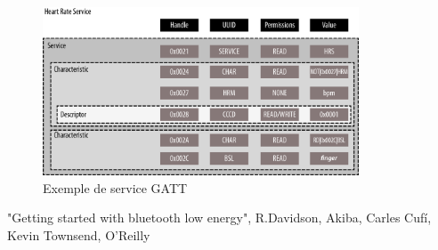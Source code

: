 \begin{frame}
	\begin{figure}
		\includegraphics[height=5cm]{img/gatt.png}
		\caption{Exemple de service GATT}
	\end{figure}
{\tiny "Getting started with bluetooth low energy", R.Davidson, Akiba, Carles Cufí, Kevin Townsend, O'Reilly}
\end{frame}
